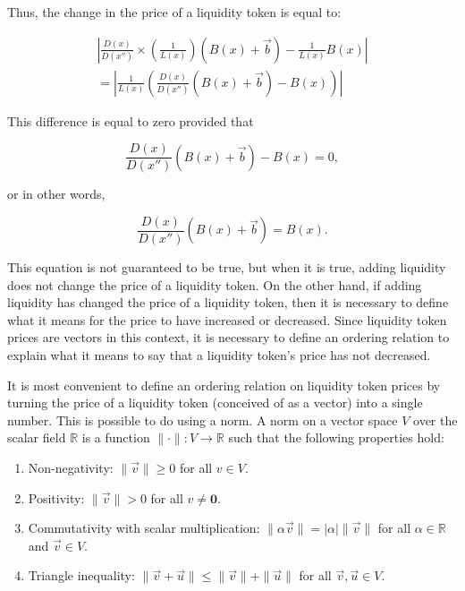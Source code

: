 \documentclass[12pt]{article}
\begin{document}
Thus, the change in the price of a liquidity token is equal to:

\begin{equation*}
	\begin{split}
	\left| \frac{D(x)}{D(x'')} \times \left (\frac{1}{L(x)} \right ) \left(B(x) + \vec{b} \right ) - \frac{1}{L(x)} B(x) \right|
\\	= \left| \frac{1}{L(x)} \left ( \frac{D(x)}{D(x'')} (B(x) + \vec{b}) - B(x) \right ) \right|
	\end{split}
\end{equation*}


This difference is equal to zero provided that

\begin{equation*}
	\frac{D(x)}{D(x'')} \left (B(x) + \vec{b} \right ) - B(x) = 0,
\end{equation*}

or in other words,

\begin{equation*}
	\frac{D(x)}{D(x'')} \left (B(x) + \vec{b} \right ) = B(x).
\end{equation*}


This equation is not guaranteed to be true, but when it is true, adding liquidity does not change the price of a liquidity token. On the other hand, if adding liquidity has changed the price of a liquidity token, then it is necessary to define what it means for the price to have increased or decreased. Since liquidity token prices are vectors in this context, it is necessary to define an ordering relation to explain what it means to say that a liquidity token's price has not decreased.

It is most convenient to define an ordering relation on liquidity token prices by turning the price of a liquidity token (conceived of as a vector) into a single number. This is possible to do using a norm. A norm on a vector space $V$ over the scalar field $\mathbb{R}$ is a function $\|\cdot\| : V \to \mathbb{R}$ such that the following properties hold:

\begin{enumerate}
	\item Non-negativity: $\|\vec{v}\| \geq 0$ for all $v \in V$.
	\item Positivity: $\|\vec{v}\| > 0$ for all $v \neq \mathbf{0}$.
	\item Commutativity with scalar multiplication: $\|\alpha \vec{v}\| = |\alpha|\|\vec{v}\|$ for all $\alpha \in \mathbb{R}$ and $\vec{v} \in V$.
	\item Triangle inequality: $\|\vec{v} + \vec{u}\| \leq \|\vec{v}\| + \|\vec{u}\|$ for all $\vec{v}, \vec{u} \in V$.
\end{enumerate}
\end{document}
